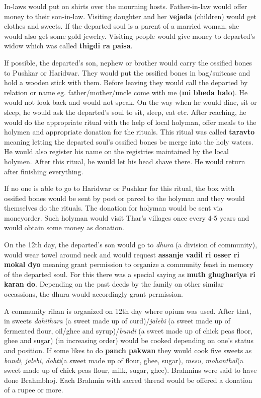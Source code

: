 In-laws would put on shirts over the mourning hosts. Father-in-law would offer
money to their son-in-law. Visiting daughter and her \textbf{vejada} (children)
would get clothes and sweets. If the departed soul is a parent of a married
woman, she would also get some gold jewelry. Visiting people would give money
to departed's widow which was called \textbf{thigdi ra paisa}.

If possible, the departed's son, nephew or brother would carry the ossified
bones to Pushkar or Haridwar. They would put the ossified bones in bag/suitcase
and hold a wooden stick with them. Before leaving they would call the departed
by relation or name eg. father/mother/uncle come with me (\textbf {mi bheda
halo}). He would not look back and would not speak. On the way when he would
dine, sit or sleep, he would ask the departed's soul to sit, sleep, eat etc.
After reaching, he would do the appropriate ritual with the help of local
holyman, offer meals to the holymen and appropriate donation for the rituals.
This ritual was called \textbf{taravto} meaning letting the departed soul's
ossified bones be merge into the holy waters. He would also register his name
on the registries maintained by the local holymen. After this ritual, he would
let his head shave there. He would return after finishing everything.

If no one is able to go to Haridwar or Pushkar for this ritual, the box with
ossified bones would be sent by post or parcel to the holyman and they would
themselves do the rituals. The donation for holyman would be sent via
moneyorder. Such holyman would visit Thar's villages once every 4-5 years and
would obtain some money as donation.

On the 12th day, the departed's son would go to \textit{dhura} (a division of
community), would wear towel around neck and would request \textbf{assanje
vadil ri osser ri mokal dyo} meaning grant permission to organize a community
feast in memory of the departed soul. For this there was a special saying as
\textbf{muth ghughariya ri karan do}. Depending on the past deeds by the family
on other similar occassions, the dhura would accordingly grant permission.

A community rihan is organized on 12th day where opium was used. After that, in
sweets \textit{dahithara} (a sweet made up of curd)/\textit{jalebi} (a sweet
made up of fermented flour, oil/ghee and syrup)/\textit{bundi} (a sweet made up
of chick peas floor, ghee and sugar) (in increasing order) would be cooked
depending on one's status and position. If some likes to do \textbf{panch
pakwan} they would cook five sweets as \textit{bundi}, \textit{jalebi},
\textit{dohti}(a sweet made up of flour, ghee, sugar), \textit{mesu},
\textit{mohanthal}(a sweet made up of chick peas flour, milk, sugar, ghee).
Brahmins were said to have done Brahmbhoj. Each Brahmin with sacred thread
would be offered a donation of a rupee or more.

